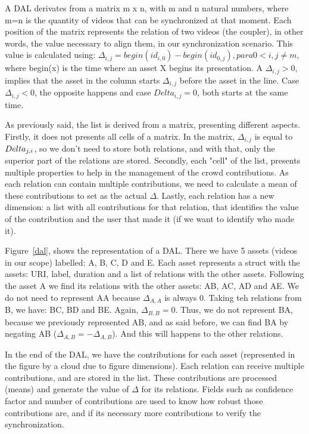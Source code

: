\documentclass[jidm,a4paper]{jidm} %
\begin{document}
A DAL derivates from a matrix m x n, with m and n natural numbers, where m=n is the quantity of videos that can be synchronized at that moment. Each position of the matrix represents the relation of two videos (the coupler), in other words, the value necessary to align them, in our synchronization scenario. This value is calculated using: $\Delta_{i,j}=begin(id_{i,0})-begin(id_{0,j}), para 0<i,j\neq m $, where begin(x) is the time where an asset X begins its presentation. A $\Delta_{i,j} > 0$, implies that the asset in the column starts $\Delta_{i,j}$ before the asset in the line. Case $\Delta_{i,j} < 0$, the opposite happens and case $Delta_{i,j} = 0$, both starts at the same time.

As previously said, the list is derived from a matrix, presenting different aspects. Firstly, it does not presents all cells of a matrix. In the matrix, $\Delta_{i,j}$ is equal to $\-Delta_{j,i}$, so we don't need to store both relations, and with that, only the superior part of the relations are stored. Secondly, each "cell" of the list, presents multiple properties to help in the management of the crowd contributions. As each relation can contain multiple contributions, we need to calculate a mean of these contributions  to set as the actual $\Delta$. Lastly, each relation has a new dimension: a list with all contributions for that relation, that identifies the value of the contribution and the user that made it (if we want to identify who made it).

Figure~\ref{dal}, shows the representation of a DAL. There we have 5 assets (videos in our scope) labelled: A, B, C, D and E. Each asset represents a struct with the assets: URI, label, duration and a list of relations with the other assets. Following the asset A we find its relations with the other assets: AB, AC, AD and AE. We do not need to represent AA because $\Delta_{A,A}$ is always 0. Taking teh relations from B, we have: BC, BD and BE.  Again, $\Delta_{B,B} = 0$. Thus, we do not represent BA, because we previously represented AB, and as said before, we can find BA by negating AB ($\Delta_{A,B} = -\Delta_{A,B}$). And this will happens to the other relations.

In the end of the DAL, we have the contributions for each asset (represented in the figure by a cloud due to figure dimensions). Each relation can receive multiple contributions, and are stored in the list. These contributions are processed (means) and generate the value of $\Delta$ for its relations. Fields such as confidence factor and number of contributions are used to know how robust those contributions are, and if its necessary more contributions to verify the synchronization.
\end{document}
